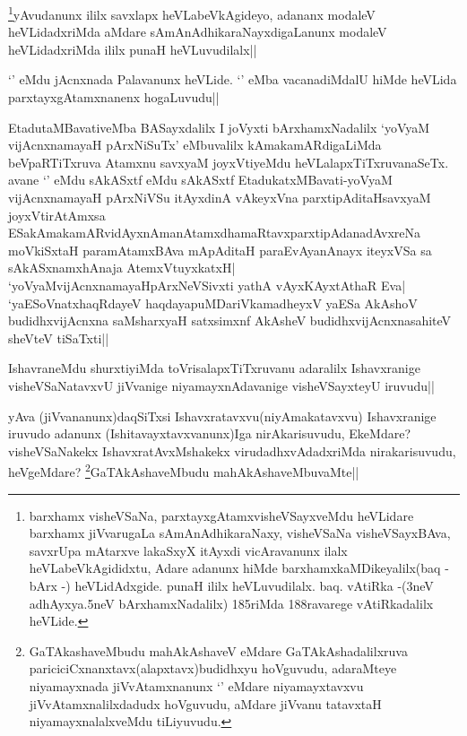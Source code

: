 \begin{artha}
\footnote{barxhamx visheVSaNa, parxtayxgAtamxvisheVSayxveMdu heVLidare barxhamx jiVvarugaLa sAmAnAdhikaraNaxy, visheVSaNa visheVSayxBAva, savxrUpa mAtarxve lakaSxyX itAyxdi vicAravanunx ilalx heVLabeVkAgididxtu, Adare adanunx hiMde barxhamxkaMDikeyalilx(baq - bArx -) heVLidAdxgide. punaH ililx heVLuvudilalx. baq. vAtiRka -(3neV adhAyxya.5neV bArxhamxNadalilx) 185riMda 188ravarege vAtiRkadalilx heVLide.}yAvudanunx ililx savxlapx heVLabeVkAgideyo, adananx modaleV heVLidadxriMda aMdare sAmAnAdhikaraNayxdigaLanunx modaleV heVLidadxriMda ililx punaH heVLuvudilalx||
\end{artha}


\begin{artha}
`\stext' eMdu jAcnxnada Palavanunx heVLide. `\stext' eMba vacanadiMdalU hiMde heVLida parxtayxgAtamxnanenx hogaLuvudu||
\end{artha}


\begin{artha}
EtadutaMBavativeMba BASayxdalilx I joVyxti bArxhamxNadalilx `yoV\s yaM vijAcnxnamayaH pArxNiSuTx' eMbuvalilx kAmakamARdigaLiMda beVpaRTiTxruva Atamxnu savxyaM joyxVtiyeMdu heVLalapxTiTxruvanaSeTx. avane `\stext' eMdu sAkASxtf eMdu sAkASxtf EtadukatxMBavati-yoV\s yaM vijAcnxnamayaH pArxNiVSu itAyxdinA vAkeyxVna parxtipAditaHsavxyaM joyxVtirAtAmxsa ESakAmakamARvidAyxnAmanAtamxdhamaRtavxparxtipAdanadAvxreNa moVkiSxtaH paramAtamxBAva mApAditaH paraEvAyanAnayx iteyxVSa sa sAkASxnamxhAnaja AtemxVtuyxkatxH| `yoV\s yaMvijAcnxnamayaHpArxNeVSivxti yathA vAyxKAyxtAthaR Eva| `yaESoV\s natxhaqRdayeV haqdayapuMDariVkamadheyxV yaESa AkAshoV budidhxvijAcnxna saMsharxyaH satxsimxnf AkAsheV budidhxvijAcnxnasahiteV sheVteV tiSaTxti||
\end{artha}

\begin{artha}
IshavraneMdu shurxtiyiMda toVrisalapxTiTxruvanu adaralilx Ishavxranige visheVSaNatavxvU jiVvanige niyamayxnAdavanige visheVSayxteyU iruvudu||
\end{artha}


\begin{artha}
yAva (jiVvananunx)daqSiTxsi Ishavxratavxvu(niyAmakatavxvu) Ishavxranige iruvudo adanunx (Ishitavayxtavxvanunx)Iga nirAkarisuvudu, EkeMdare? visheVSaNakekx IshavxratAvxMshakekx virudadhxvAdadxriMda nirakarisuvudu, heVgeMdare? \footnote{GaTAkashaveMbudu mahAkAshaveV eMdare GaTAkAshadalilxruva pariciciCxnanxtavx(alapxtavx)budidhxyu hoVguvudu, adaraMteye niyamayxnada jiVvAtamxnanunx `\stext' eMdare niyamayxtavxvu jiVvAtamxnalilxdadudx hoVguvudu, aMdare jiVvanu tatavxtaH niyamayxnalalxveMdu tiLiyuvudu.}GaTAkAshaveMbudu mahAkAshaveMbuvaMte||
\end{artha}

